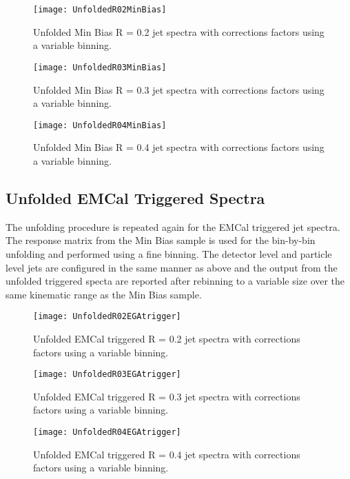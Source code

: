\begin{figure}[h]
\texttt{[image: UnfoldedR02MinBias]}
\centering
\caption{Unfolded Min Bias R = 0.2 jet spectra with corrections factors using a variable binning.}
\label{fig:UnfoldvarR02}
\end{figure}

\begin{figure}[h]
\texttt{[image: UnfoldedR03MinBias]}
\centering
\caption{Unfolded Min Bias R = 0.3 jet spectra with corrections factors using a variable binning.}
\label{fig:UnfoldvarR03}
\end{figure}

\begin{figure}[h]
\texttt{[image: UnfoldedR04MinBias]}
\centering
\caption{Unfolded Min Bias R = 0.4 jet spectra with corrections factors using a variable binning.}
\label{fig:UnfoldvarR04}
\end{figure}


\subsection{Unfolded EMCal Triggered Spectra}
The unfolding procedure is repeated again for the EMCal triggered jet spectra.  The response matrix from the Min Bias sample is used for the bin-by-bin unfolding and performed using a fine binning.  The detector level and particle level jets are configured in the same manner as above and the output from the unfolded triggered specta are reported after rebinning to a variable size over the same kinematic range as the Min Bias sample.

\begin{figure}[h]
\texttt{[image: UnfoldedR02EGAtrigger]}
\centering
\caption{Unfolded EMCal triggered R = 0.2 jet spectra with corrections factors using a variable binning.}
\label{fig:UnfoldvarR02EGA}
\end{figure}

\begin{figure}[h]
\texttt{[image: UnfoldedR03EGAtrigger]}
\centering
\caption{Unfolded EMCal triggered R = 0.3 jet spectra with corrections factors using a variable binning.}
\label{fig:UnfoldvarR03EGA}
\end{figure}

\begin{figure}[h]
\texttt{[image: UnfoldedR04EGAtrigger]}
\centering
\caption{Unfolded EMCal triggered R = 0.4 jet spectra with corrections factors using a variable binning.}
\label{fig:UnfoldvarR04EGA}
\end{figure}

